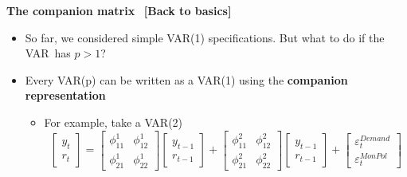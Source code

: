\documentclass[10pt,english,t,aspectratio=169,ignorenonframetext]{beamer}
\begin{document}

\begin{frame}
{\color{note} \textbf{The companion matrix} \ {\footnotesize \textbf{[Back
to basics]}}}\vspace{-.1cm}

\begin{itemize}
\item So far, we considered simple VAR(1) specifications. But what to do if
the VAR\ has $p>1$?\bigskip

\item Every VAR(p) can be written as a VAR(1) using the \textbf{companion
representation}\bigskip

\begin{itemize}
\item For example, take a VAR(2)%
\begin{equation*}
\left[ 
\begin{array}{c}
y_{t} \\ 
r_{t}%
\end{array}%
\right] =%
\begin{bmatrix}
\phi _{11}^{1} & \phi _{12}^{1} \\ 
\phi _{21}^{1} & \phi _{22}^{1}%
\end{bmatrix}%
\left[ 
\begin{array}{c}
y_{t-1} \\ 
r_{t-1}%
\end{array}%
\right] +%
\begin{bmatrix}
\phi _{11}^{2} & \phi _{12}^{2} \\ 
\phi _{21}^{2} & \phi _{22}^{2}%
\end{bmatrix}%
\left[ 
\begin{array}{c}
y_{t-1} \\ 
r_{t-1}%
\end{array}%
\right] +%
\begin{bmatrix}
\varepsilon _{t}^{Demand} \\ 
\varepsilon _{t}^{MonPol}%
\end{bmatrix}%
\end{equation*}
\medskip


\end{itemize}
\end{itemize}
\end{frame}
\end{document}
